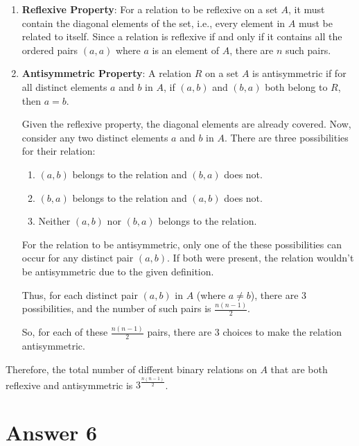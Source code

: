 \documentclass[12pt]{article}
\begin{document}
\begin{enumerate}
    \item \textbf{Reflexive Property}:
    For a relation to be reflexive on a set \( A \), it must contain the diagonal elements of the set, i.e., every element in \( A \) must be related to itself. Since a relation is reflexive if and only if it contains all the ordered pairs \( (a, a) \) where \( a \) is an element of \( A \), there are \( n \) such pairs.
    
    \item \textbf{Antisymmetric Property}:
    A relation \( R \) on a set \( A \) is antisymmetric if for all distinct elements \( a \) and \( b \) in \( A \), if \( (a, b) \) and \( (b, a) \) both belong to \( R \), then \( a = b \).
    
    Given the reflexive property, the diagonal elements are already covered. Now, consider any two distinct elements \( a \) and \( b \) in \( A \). There are three possibilities for their relation:
    
    \begin{enumerate}
        \item \( (a, b) \) belongs to the relation and \( (b, a) \) does not.
        \item \( (b, a) \) belongs to the relation and \( (a, b) \) does not.
        \item Neither \( (a, b) \) nor \( (b, a) \) belongs to the relation.
    \end{enumerate}
    
    For the relation to be antisymmetric, only one of the these possibilities can occur for any distinct pair \( (a, b) \). If both were present, the relation wouldn't be antisymmetric due to the given definition.
    
    Thus, for each distinct pair \( (a, b) \) in \( A \) (where \( a \neq b \)), there are 3 possibilities, and the number of such pairs is \( \frac{n(n-1)}{2} \). 
    
    So, for each of these \( \frac{n(n-1)}{2} \) pairs, there are 3 choices to make the relation antisymmetric.
\end{enumerate}

Therefore, the total number of different binary relations on \( A \) that are both reflexive and antisymmetric is \( 3^{\frac{n(n-1)}{2}} \).



\section*{Answer 6}
\end{document}
